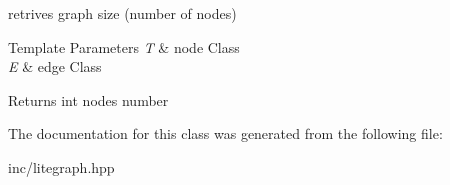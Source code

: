 retrives graph size (number of nodes) 


\begin{DoxyTemplParams}{Template Parameters}
{\em T} & node Class \\
\hline
{\em E} & edge Class\\
\hline
\end{DoxyTemplParams}
\begin{DoxyReturn}{Returns}
int nodes number 
\end{DoxyReturn}


The documentation for this class was generated from the following file\+:\begin{DoxyCompactItemize}
\item 
inc/litegraph.\+hpp\end{DoxyCompactItemize}
